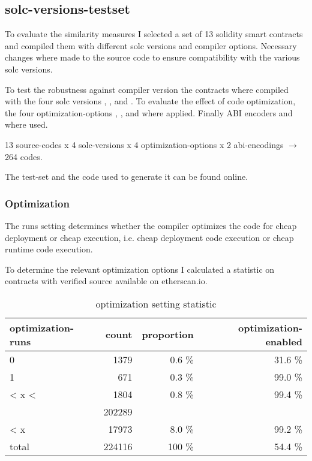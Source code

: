 \documentclass[../main.tex]{subfiles}
\begin{document}
\subsection{solc-versions-testset}
To evaluate the similarity measures I selected a set of 13 solidity smart contracts and compiled
them with different solc versions and compiler options.
Necessary changes where made to the source code to ensure compatibility with the various solc
versions.

To test the robustness against compiler version the contracts where compiled with the four solc versions , ,  and .
To evaluate the effect of code optimization, the four optimization-options , ,  and  where applied.
Finally ABI encoders  and  where used.

13 source-codes x 4 solc-versions x 4 optimization-options x 2 abi-encodings \(\rightarrow\) 264 codes.

The test-set and the code used to generate it can be found online\cite{solc-versions-testset}.

\subsubsection{Optimization}
The runs setting determines whether the compiler optimizes the code for cheap deployment or cheap execution, i.e. cheap deployment code execution or cheap runtime code execution.

To determine the relevant optimization options I calculated a statistic  on contracts with verified source available on etherscan.io.

\begin{table*}[ht]
  \centering
  \begin{tabular}{lrrr}
    optimization-runs & count  & proportion           & optimization-enabled \\
    \hline
    0                 & 1379   & 0.6 \%               & 31.6 \%              \\
    1                 & 671    & 0.3 \%               & 99.0 \%              \\
    < x <             & 1804   & 0.8 \%               & 99.4 \%              \\
    \color{red}{200}  & 202289 & \color{red}{90.3 \%} & \color{red}{50.0 \%} \\
    < x               & 17973  & 8.0 \%               & 99.2 \%              \\
    \hline
    total             & 224116 & 100 \%               & 54.4 \%
  \end{tabular}
  \caption{optimization setting statistic}
  \label{tbl:opti_stat}
\end{table*}
\end{document}
